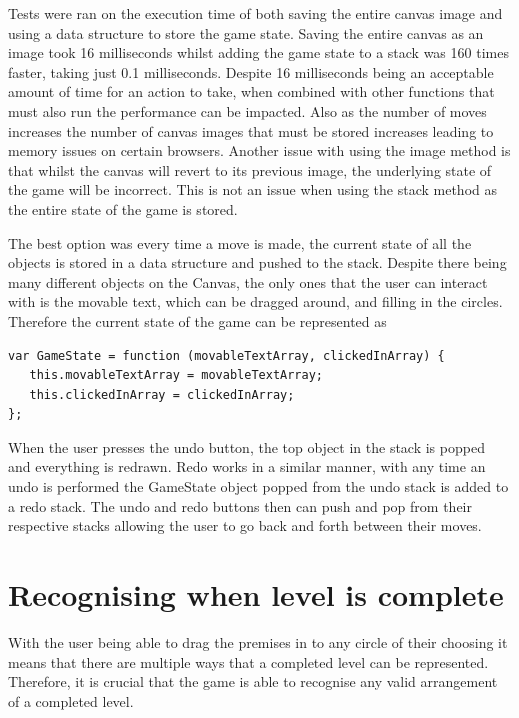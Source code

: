 \documentclass[12pt,a4paper]{report}
\begin{document}
Tests were ran on the execution time of both saving the entire canvas image and using a data structure to store the game state. Saving the entire canvas as an image took 16 milliseconds whilst adding the game state to a stack was 160 times faster, taking just 0.1 milliseconds. Despite 16 milliseconds being an acceptable amount of time for an action to take, when combined with other functions that must also run the performance can be impacted. Also as the number of moves increases the number of canvas images that must be stored increases leading to memory issues on certain browsers. Another issue with using the image method is that whilst the canvas will revert to its previous image, the underlying state of the game will be incorrect. This is not an issue when using the stack method as the entire state of the game is stored.

The best option was every time a move is made, the current state of all the objects is stored in a data structure and pushed to the stack. Despite there being many different objects on the Canvas, the only ones that the user can interact with is the movable text, which can be dragged around, and filling in the circles. Therefore the current state of the game can be represented as
 
\begin{minipage}{\linewidth}
\begin{lstlisting}
var GameState = function (movableTextArray, clickedInArray) {
   this.movableTextArray = movableTextArray;
   this.clickedInArray = clickedInArray;
};
\end{lstlisting}
\end{minipage}

 When the user presses the undo button, the top object in the stack is popped and everything is redrawn. 
Redo works in a similar manner, with any time an undo is performed the GameState object popped from the undo stack is added to a redo stack. The undo and redo buttons then can push and pop from their respective stacks allowing the user to go back and forth between their moves.

\section{Recognising when level is complete}
With the user being able to drag the premises in to any circle of their choosing it means that there are multiple ways that a completed level can be represented.
Therefore, it is crucial that the game is able to recognise any valid arrangement of a completed level.
\end{document}
